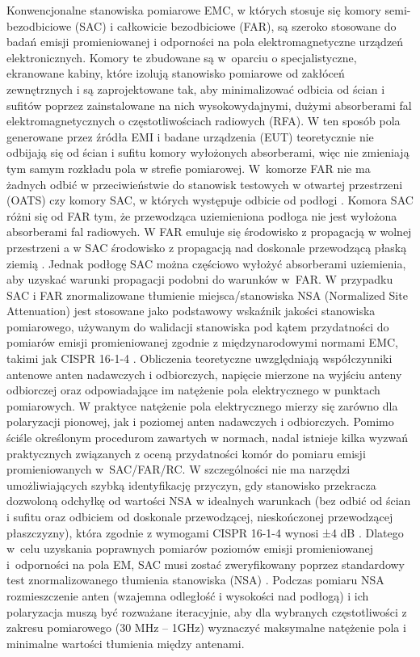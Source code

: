 Konwencjonalne stanowiska pomiarowe EMC, w których stosuje się komory semi-bezodbiciowe (SAC) i całkowicie bezodbiciowe (FAR), są szeroko stosowane do badań emisji promieniowanej i odporności na pola elektromagnetyczne urządzeń elektronicznych. Komory te zbudowane są w~oparciu o specjalistyczne, ekranowane kabiny, które izolują stanowisko pomiarowe od zakłóceń zewnętrznych i są zaprojektowane tak, aby minimalizować odbicia od ścian i sufitów poprzez zainstalowane na nich wysokowydajnymi, dużymi absorberami fal elektromagnetycznych o częstotliwościach radiowych (RFA). W ten sposób pola generowane przez źródła EMI i badane urządzenia (EUT) teoretycznie nie odbijają się od ścian i sufitu komory wyłożonych absorberami, więc nie zmieniają tym samym rozkładu pola w strefie pomiarowej. W~komorze FAR nie ma żadnych odbić w przeciwieństwie do stanowisk testowych w otwartej przestrzeni (OATS) czy komory SAC, w których występuje odbicie od podłogi \cite{15SEDAT15}. Komora SAC różni się od FAR tym, że przewodząca uziemieniona podłoga nie jest wyłożona absorberami fal radiowych. W FAR emuluje się  środowisko z propagacją w wolnej przestrzeni a w SAC środowisko z propagacją nad doskonale przewodzącą płaską ziemią \cite{10SERRA10}. Jednak podłogę SAC można częściowo wyłożyć absorberami uziemienia, aby uzyskać warunki propagacji podobni do warunków w~FAR. 
W przypadku SAC i FAR znormalizowane tłumienie miejsca/stanowiska NSA (Normalized Site Attenuation) jest stosowane jako podstawowy wskaźnik jakości stanowiska pomiarowego, używanym do walidacji stanowiska pod kątem przydatności do pomiarów emisji promieniowanej zgodnie z międzynarodowymi normami EMC, takimi jak CISPR 16-1-4 \cite{4KOVAR4,6WILSON6}. Obliczenia teoretyczne uwzględniają współczynniki antenowe anten nadawczych i odbiorczych, napięcie mierzone na wyjściu anteny odbiorczej oraz odpowiadające im natężenie pola elektrycznego w punktach pomiarowych. W praktyce natężenie pola elektrycznego mierzy się zarówno dla polaryzacji pionowej, jak i poziomej anten nadawczych i odbiorczych. Pomimo ściśle określonym procedurom zawartych w normach, nadal istnieje kilka wyzwań praktycznych związanych z oceną przydatności komór do pomiaru emisji promieniowanych w~SAC/FAR/RC. W szczególności nie ma narzędzi umożliwiających szybką identyfikację przyczyn, gdy stanowisko przekracza dozwoloną odchyłkę od wartości NSA w idealnych warunkach (bez odbić od ścian i sufitu oraz odbiciem od doskonale przewodzącej, nieskończonej przewodzącej płaszczyzny), która zgodnie z wymogami CISPR 16-1-4 wynosi ±4 dB \cite{6WILSON6}. Dlatego w~celu uzyskania poprawnych pomiarów poziomów emisji promieniowanej i~odporności na pola EM, SAC musi zostać zweryfikowany poprzez standardowy test znormalizowanego tłumienia stanowiska (NSA) \cite{4KOVAR4,6WILSON6}. Podczas pomiaru NSA rozmieszczenie anten (wzajemna odległość i wysokości nad podłogą) i ich polaryzacja muszą być rozważane iteracyjnie, aby dla wybranych częstotliwości z zakresu pomiarowego (30 MHz – 1GHz) wyznaczyć maksymalne natężenie pola i minimalne wartości tłumienia między antenami.
